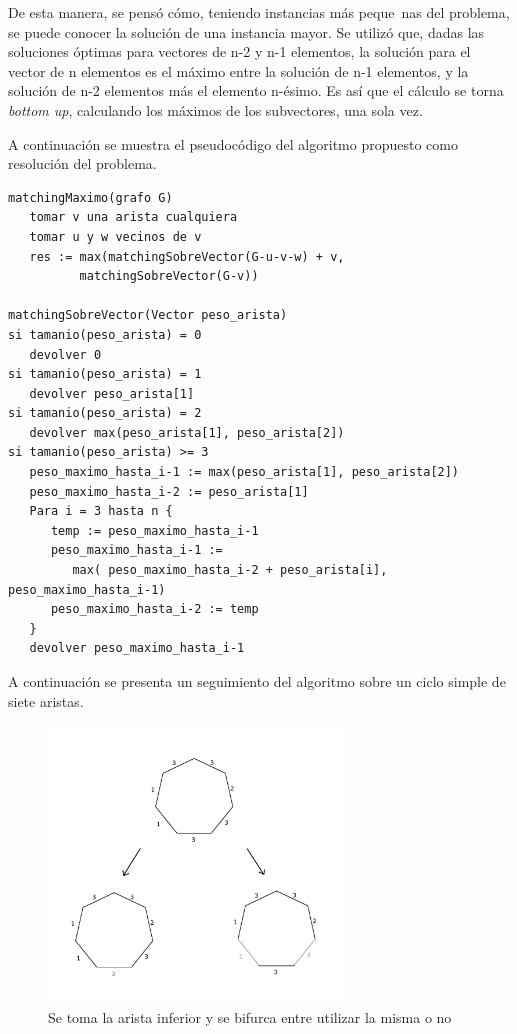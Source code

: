 \documentclass[a4paper, 12pt]{article}
\begin{document}
De esta manera, se pensó cómo, teniendo instancias más peque~{n}as del problema, se puede conocer la solución de una instancia mayor. Se utilizó que, dadas las soluciones óptimas para vectores de n-2 y n-1 elementos, la solución para el vector de n elementos es el máximo entre la solución de n-1 elementos, y la solución de n-2 elementos más el elemento n-ésimo. Es así que el cálculo se torna \emph{bottom up}, calculando los máximos de los subvectores, una sola vez.

A continuación se muestra el pseudocódigo del algoritmo propuesto como resolución del problema.


\begin{verbatim}
matchingMaximo(grafo G)
   tomar v una arista cualquiera
   tomar u y w vecinos de v
   res := max(matchingSobreVector(G-u-v-w) + v, 
          matchingSobreVector(G-v))

matchingSobreVector(Vector peso_arista)
si tamanio(peso_arista) = 0
   devolver 0
si tamanio(peso_arista) = 1
   devolver peso_arista[1]
si tamanio(peso_arista) = 2
   devolver max(peso_arista[1], peso_arista[2])
si tamanio(peso_arista) >= 3
   peso_maximo_hasta_i-1 := max(peso_arista[1], peso_arista[2]) 
   peso_maximo_hasta_i-2 := peso_arista[1]
   Para i = 3 hasta n {
      temp := peso_maximo_hasta_i-1
      peso_maximo_hasta_i-1 := 
         max( peso_maximo_hasta_i-2 + peso_arista[i], peso_maximo_hasta_i-1)
      peso_maximo_hasta_i-2 := temp
   }
   devolver peso_maximo_hasta_i-1

\end{verbatim}

A continuación se presenta un seguimiento del algoritmo sobre un ciclo simple de siete aristas.

\begin{figure}[H]
\begin{center}
\includegraphics[width=0.7\textwidth]{imagenes/paso1y2.png}
\caption{Se toma la arista inferior y se bifurca entre utilizar la misma o no}
\end{center}
\end{figure}
\end{document}
